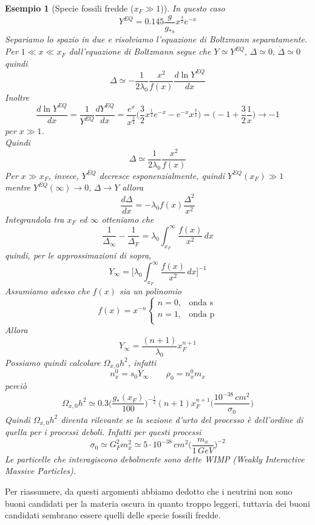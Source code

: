 \documentclass[10pt,a4paper]{article}
\theoremstyle{break}
\newtheorem{ex}{Esempio}
\theoremstyle{remark}
\theoremstyle{definition}
\begin{document}
\begin{ex}[Specie fossili fredde ($x_F \gg 1$)]
	In questo caso
	\[
	Y^{EQ} =  0.145\frac{g}{g_{*s}}x^\frac32 e^{-x}
	\]
	Separiamo lo spazio in due e risolviamo l'equazione di Boltzmann separatamente.\\
	Per $1 \ll x \ll x_F$ dall'equazione di Boltzmann segue che $Y \simeq Y^{EQ}, \, \Delta \simeq 0, \, \dot{\Delta} \simeq 0$  quindi
	\[
	\Delta \simeq -\frac{1}{2 \lambda_0} \frac{x^2}{f(x)} \frac{d\ln Y^{EQ}}{dx}
	\]
	Inoltre
	\[
	\frac{d\ln Y^{EQ}}{dx} = \frac{1}{Y^{EQ}} \frac{dY^{EQ}}{dx} = \frac{e^x}{x^\frac32} \bigg(\frac32 x^\frac12 e^{-x} - e^{-x} x^\frac32\bigg) = \bigg(-1 + \frac32 \frac1x\bigg) \to -1
	\]
	per $x \gg 1$.\\
	Quindi
	\[
	\Delta \simeq \frac{1}{2 \lambda_0} \frac{x^2}{f(x)}
	\]
	Per $x \gg x_F$, invece, $Y^{EQ}$ decresce esponenzialmente, quindi $Y^{EQ}(x_F) \gg 1 $ mentre $Y^{EQ}(\infty) \to 0, \, \Delta \to Y$ allora
	\[
	\frac{d\Delta}{dx} = - \lambda_0 f(x)\frac{\Delta^2}{ x^2}
	\]
	Integrandola tra $x_F$ ed $\infty$ otteniamo che
	\[
	\frac{1}{\Delta_\infty} - \frac{1}{\Delta_F} = \lambda_0 \int_{x_F}^{\infty} \frac{f(x)}{x^2}\, dx
	\]
	quindi, per le approssimazioni di sopra,
	\[
	Y_\infty = \bigg[\lambda_0 \int_{x_F}^{\infty} \frac{f(x)}{x^2}\, dx\bigg]^{-1}
	\]
	Assumiamo adesso che $f(x)$ sia un polinomio
	\[
	f(x) = x^{-n} \begin{cases}
		n = 0,& \text{onda s} \\
		n = 1, & \text{onda p} \\
	\end{cases}
	\]
	Allora
	\[
	Y_\infty = \frac{(n + 1)}{\lambda_0} x_F^{n + 1}
 	\] 
 	Possiamo quindi calcolare $\Omega_{x, 0}h^2$, infatti
 	\[
 	n_x^0 = s_0 Y_\infty \qquad \rho_0 = n_x^0 m_x
 	\]
 	perciò
 	\[
 	\Omega_{x, 0}h^2 \simeq 0.3 \bigg(\frac{g_*(x_F)}{100}\bigg)^{-\frac12} (n + 1) x_F^{n + 1} \bigg(\frac{10^{-38} \, cm^2}{\sigma_0}\bigg)
 	\]
 	Quindi $\Omega_{x, 0}h^2$ diventa rilevante se la sezione d'urto del processo è dell'ordine di quella per i processi deboli. Infatti per questi processi
 	\[
 	\sigma_0 \simeq G_F^2 m_x^2 \simeq 5 \cdot	10^{-38} \, cm^2 \bigg(\frac{m_x}{1\, GeV}\bigg)^{-2}
 	\]
 	Le particelle che interagiscono debolmente sono dette WIMP (Weakly Interactive Massive Particles).
\end{ex}
Per riassumere, da questi argomenti abbiamo dedotto che i neutrini non sono buoni candidati per la materia oscura in quanto troppo leggeri, tuttavia dei buoni candidati sembrano essere quelli delle specie fossili fredde.
\end{document}
